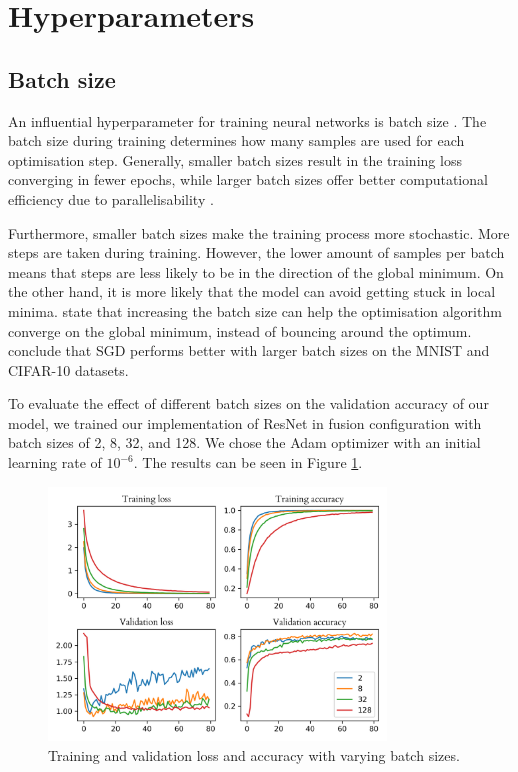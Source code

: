 \documentclass{l4proj}
\begin{document}

\section{Hyperparameters}

\subsection{Batch size}

An influential hyperparameter for training neural networks is batch size \citep{ioffe_batch_2015}. The batch size during training determines how many samples are used for each optimisation step. Generally, smaller batch sizes result in the training loss converging in fewer epochs, while larger batch sizes offer better computational efficiency due to parallelisability \cite{devarakonda_adabatch_2018}.

Furthermore, smaller batch sizes make the training process more stochastic. More steps are taken during training. However, the lower amount of samples per batch means that steps are less likely to be in the direction of the global minimum. On the other hand, it is more likely that the model can avoid getting stuck in local minima. \citet{smith_dont_2018} state that increasing the batch size can help the optimisation algorithm converge on the global minimum, instead of bouncing around the optimum. \citet{radiuk_impact_2017} conclude that SGD performs better with larger batch sizes on the MNIST and CIFAR-10 datasets.

To evaluate the effect of different batch sizes on the validation accuracy of our model, we trained our implementation of ResNet in fusion configuration with batch sizes of 2, 8, 32, and 128. We chose the Adam optimizer with an initial learning rate of $10^{-6}$. The results can be seen in Figure \ref{fig:batch_size}.

\begin{figure}[ht]
  \centering
  \includegraphics[width=0.8\textwidth]{images/evaluation/batch_size/history.png}
  \caption{Training and validation loss and accuracy with varying batch sizes.}
  \label{fig:batch_size}
\end{figure}
\end{document}

